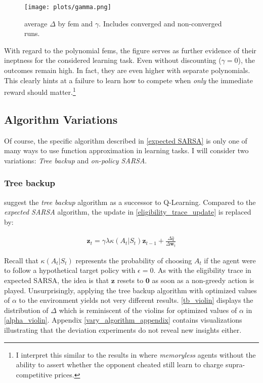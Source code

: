 \begin{figure}
	\texttt{[image: plots/gamma.png]}
	\caption[average $\Delta$ by \gls{fem} and $\gamma$]{average $\Delta$ by \gls{fem} and $\gamma$. Includes converged and non-converged runs.}
	\label{gamma}
\end{figure}

With regard to the polynomial \gls{fem}s, the figure serves as further evidence of their ineptness for the considered learning task. Even without discounting ($\gamma = 0$), the outcomes remain high. In fact, they are even higher with separate polynomials. This clearly hints at a failure to learn how to compete when \emph{only} the immediate reward should matter.\footnote{I interpret this similar to the results in \textcite{waltman_q-learning_2008} where \emph{memoryless} agents without the ability to assert whether the opponent cheated still learn to charge supra-competitive prices.}

\subsection{Algorithm Variations}\label{vary_algorithm}

Of course, the specific algorithm described in \autoref{expected SARSA} is only one of many ways to use function approximation in learning tasks. I will consider two variations: \emph{Tree backup} and \emph{on-policy SARSA}.

\subsubsection{Tree backup}

\textcite{precup_eligibility_2000} suggest the \emph{tree backup} algorithm as a successor to Q-Learning. Compared to the \emph{expected SARSA} algorithm, the update in \autoref{eligibility_trace_update} is replaced by:

\begin{gather}\label{eligibility_traces_tree_backup}
\boldsymbol{z}_t = \gamma \lambda \kappa(A_t | S_t) \boldsymbol{z}_{t-1} + \frac{\Delta \hat{q}}{\Delta \boldsymbol{w}_t}
\end{gather}

Recall that $\kappa(A_t | S_t)$ represents the probability of choosing $A_t$ if the agent were to follow a hypothetical target policy with $\epsilon= 0$. As with the eligibility trace in expected SARSA, the idea is that $\boldsymbol{z}$ resets to $\boldsymbol{0}$ as soon as a non-greedy action is played. Unsurprisingly, applying the tree backup algorithm with optimized values of $\alpha$ to the environment yields not very different results. \autoref{tb_violin} displays the distribution of $\Delta$ which is reminiscent of the violins for optimized values of $\alpha$ in \autoref{alpha_violin}. Appendix \ref{vary_algorithm_appendix} contains visualizations illustrating that the deviation experiments do not reveal new insights either.

